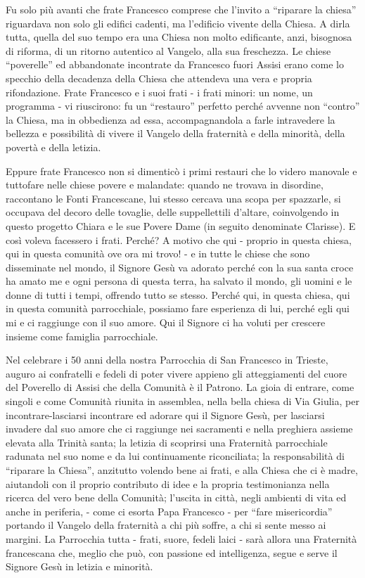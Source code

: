 Fu solo più avanti che frate Francesco comprese che l’invito a “riparare la chiesa”
riguardava non solo gli edifici cadenti, ma l’edificio vivente della Chiesa. A dirla tutta, quella  del 
suo tempo era una Chiesa non molto edificante, anzi, bisognosa  di riforma, di un ritorno autentico 
al Vangelo, alla sua freschezza. Le chiese “poverelle” ed abbandonate incontrate da Francesco fuori 
Assisi erano come lo specchio della decadenza della Chiesa che attendeva  una vera e propria 
rifondazione. Frate Francesco e i suoi frati - i frati minori: un nome, un programma  - vi riuscirono: 
fu un “restauro” perfetto perché avvenne non “contro” la Chiesa, ma in obbedienza ad essa, 
accompagnandola a farle intravedere la bellezza e possibilità di vivere il Vangelo della fraternità e 
della minorità, della povertà e della letizia.

Eppure frate Francesco non si dimenticò i primi restauri che lo videro manovale e tuttofare 
nelle chiese povere e malandate: quando ne trovava in disordine, raccontano le Fonti Francescane, 
lui stesso cercava una scopa per spazzarle, si occupava del decoro delle tovaglie, delle suppellettili 
d’altare, coinvolgendo in questo progetto Chiara e le sue Povere Dame (in seguito denominate 
Clarisse). E così voleva facessero i frati. Perché? A motivo che qui - proprio in questa chiesa, qui in 
questa comunità ove ora mi trovo! - e in tutte le chiese che sono disseminate nel mondo, il Signore 
Gesù va adorato perché con la sua santa croce ha amato me e ogni persona di questa terra, ha 
salvato il mondo, gli uomini e le donne di tutti i tempi, offrendo tutto se stesso. Perché qui, in 
questa chiesa, qui in questa comunità parrocchiale, possiamo fare esperienza di lui, perché egli qui 
mi e ci raggiunge con il suo amore. Qui il Signore ci ha voluti per crescere insieme come famiglia 
parrocchiale.

Nel celebrare i 50 anni della nostra Parrocchia di San Francesco in Trieste, auguro ai
confratelli e fedeli di poter vivere appieno gli atteggiamenti del cuore del Poverello di Assisi che 
della Comunità è il Patrono. La gioia di entrare, come singoli e come Comunità riunita in 
assemblea, nella bella chiesa di Via Giulia, per incontrare-lasciarsi incontrare ed adorare qui il 
Signore Gesù, per lasciarsi invadere dal suo amore che ci raggiunge nei sacramenti e nella preghiera 
assieme elevata alla Trinità santa; la letizia di scoprirsi una Fraternità parrocchiale radunata nel suo 
nome e da lui continuamente riconciliata; la responsabilità di “riparare la Chiesa”, anzitutto volendo 
bene ai frati, e alla Chiesa che ci è madre, aiutandoli con il proprio contributo di idee e la propria 
testimonianza nella ricerca del vero bene della Comunità; l’uscita in città, negli ambienti di vita ed 
anche in periferia, - come ci esorta Papa Francesco - per “fare misericordia” portando il Vangelo 
della fraternità a chi più soffre, a chi si sente messo ai margini.
La Parrocchia tutta - frati, suore, fedeli laici - sarà allora una Fraternità francescana che, meglio che 
può, con passione ed intelligenza,  segue e serve il Signore Gesù in letizia e minorità.

